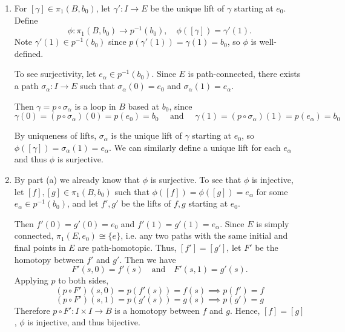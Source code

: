 \documentclass[12pt]{article}
\begin{document}
\begin{solution}
    \bbni
    \begin{enumerate}
        \item [(a)] For $[\gamma] \in \pi_1(B, b_0)$, let $\gamma' : I \to E$ be the unique lift of $\gamma$ starting at $e_0$. Define
        \[
            \phi: \pi_1(B, b_0) \to p^{-1}(b_0), \quad \phi([\gamma])
            = \gamma'(1).
        \]
        Note $\gamma'(1) \in p^{-1}(b_0)$ since $p(\gamma'(1)) = \gamma(1)
        = b_0$, so $\phi$ is well-defined.

        

        To see surjectivity, let $e_\alpha \in p^{-1}(b_0)$. Since $E$ is path-connected, there exists a path $\sigma_\alpha: I \to E$ such that $\sigma_\alpha(0) = e_0$ and $\sigma_\alpha(1) = e_\alpha$. 
        
        Then $\gamma = p \circ \sigma_\alpha$ is a loop in $B$ based at $b_0$, since 
        \[\gamma(0) = (p \circ \sigma_\alpha) (0) = p(e_0) = b_0 \quad \text{ and } \quad \gamma(1) = (p \circ \sigma_\alpha) (1) = p(e_\alpha) = b_0\]
       
        By uniqueness of lifts, $\sigma_\alpha$ is the unique lift of $\gamma$ starting at $e_0$, so $\phi([\gamma]) = \sigma_\alpha(1) = e_\alpha$. We can similarly define a unique lift for each $e_\alpha$ and thus $\phi$ is surjective.
        
        \item [(b)] 
        By part (a) we already know that $\phi$ is surjective. To see that $\phi$ is injective, let $[f], [g] \in \pi_1(B, b_0)$ such that $\phi([f]) = \phi([g]) = e_\alpha$ for some $e_\alpha \in p^{-1}(b_0)$, and let $f', g'$ be the lifts of $f, g$ starting at $e_0$. 
         
        Then $f'(0) = g'(0) = e_0$ and $f'(1) = g'(1)= e_\alpha$. Since $E$ is simply connected, $\pi_1(E, e_0) \cong \{e\}$, i.e. any two paths with the same initial and final points in $E$ are path-homotopic. Thus, $[f'] = [g']$, let $F'$ be the homotopy between $f'$ and $g'$. Then we have
        \[
            F'(s,0) = f'(s) \quad \text{and} \quad F'(s,1) = g'(s).
        \]
        Applying $p$ to both sides,
        \[
            (p \circ F')(s,0) = p(f'(s)) = f(s) \implies p (f') = f
        \]
        \[
            (p \circ F')(s,1) = p(g'(s)) = g(s)\implies p (g') = g
        \]
        Therefore $p \circ F' : I \times I \to B$ is a homotopy between $f$
        and $g$.
        Hence, $[f] = [g]$, $\phi$ is injective, and thus bijective.
    \end{enumerate}
\end{solution}
\end{document}
